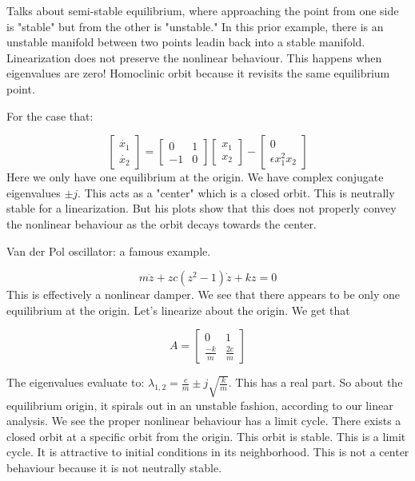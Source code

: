 \documentclass[11pt]{article}
\begin{document}
Talks about semi-stable equilibrium, where approaching the point from one side is "stable" but from the other is "unstable." In this prior example, there is an unstable manifold between two points leadin back into a stable manifold. Linearization does not preserve the nonlinear behaviour. This happens when eigenvalues are zero! Homoclinic orbit because it revisits the same equilibrium point.

For the case that:

\begin{equation}
\begin{bmatrix}
\dot{x_1} \\
\dot{x_2}
\end{bmatrix}
=
\begin{bmatrix}
0 & 1 \\
-1 & 0
\end{bmatrix}
\begin{bmatrix}
{x_1} \\
{x_2}
\end{bmatrix}
-
\begin{bmatrix}
0 \\
\epsilon x_1^2 x_2
\end{bmatrix}
\end{equation}
Here we only have one equilibrium at the origin. We have complex conjugate eigenvalues $\pm j$. This acts as a "center" which is a closed orbit. This is neutrally stable for a linearization. But his plots show that this does not properly convey the nonlinear behaviour as the orbit decays towards the center.

Van der Pol oscillator: a famous example.

\begin{equation}
m\ddot{z} + zc(z^2-1)\dot{z} + kz =0	
\end{equation}
This is effectively a nonlinear damper. We see that there appears to be only one equilibrium at the origin. Let's linearize about the origin. We get that 


\begin{equation}A = 
\begin{bmatrix}
0 & 1\\
\frac{-k}{m} & \frac{2c}{m}
\end{bmatrix}
\end{equation}

The eigenvalues evaluate to: $\lambda_{1,2} = \frac{c}{m}\pm j \sqrt{\frac{k}{m}}$. This has a real part. So about the equilibrium origin, it spirals out in an unstable fashion, according to our linear analysis. We see the proper nonlinear behaviour has a limit cycle. There exists a closed orbit at a specific orbit from the origin. This orbit is stable. This is a limit cycle. It is attractive to initial conditions in its neighborhood. This is not a center behaviour because it is not neutrally stable. 
\end{document}
